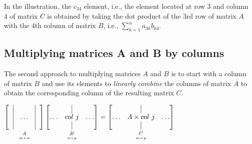\documentclass[../main.tex]{subfiles}
\begin{document}
In the illustration, the \(c_{34}\) element, i.e., the element located at row 3 and column 4 of matrix \(C\) is obtained by taking the dot product of the 3rd row of matrix \(A\) with the 4th column of matrix \(B\), i.e., \(\sum_{k=1}^{n} a_{3 k} b_{k 4}\).


\subsection{Multiplying matrices A and B by columns}
The second approach to multiplying matrices \(A\) and \(B\) is to start with a column of matrix \(B\) and use its elements to \emph{linearly combine} the columns of matrix \(A\) to obtain the corresponding column of the resulting matrix \(C\).

\begin{adjustbox}{width = \columnwidth}
    \renewcommand\arraystretch{1.5}
    \(
    \underbracket[0pt][0pt]{
        \begin{bmatrix}
            \kern.6em\vline &       & \vline\kern.6em \\
            \kern.6em\vline & \dots & \vline\kern.6em \\
            \kern.6em\vline &       & \vline\kern.6em
        \end{bmatrix}
    }_{\mathstrut \underset{m \times n}{A}}
    \underbracket[0pt][0pt]{
        \begin{bmatrix}
                  & \kern.2em\vline\kern.2em &       \\
            \dots & col \ j                  & \dots \\
                  & \kern.2em\vline\kern.2em &
        \end{bmatrix}
    }_{\mathstrut \underset{n \times p}{B}}
    =
    \underbracket[0pt][0pt]{
        \begin{bmatrix}
                  & \kern.2em\vline\kern.2em &       \\
            \dots & A \times col \ j         & \dots \\
                  & \kern.2em\vline\kern.2em &       \\
        \end{bmatrix}
    }_{\mathstrut \underset{m \times p}{C}}
    \)
\end{adjustbox}
\end{document}
